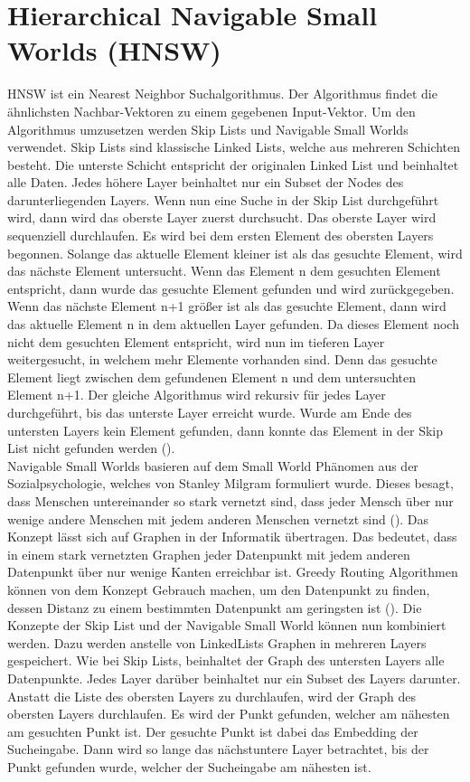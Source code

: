 \section{Hierarchical Navigable Small Worlds (HNSW)}
HNSW ist ein Nearest Neighbor Suchalgorithmus.
Der Algorithmus findet die ähnlichsten Nachbar-Vektoren zu einem gegebenen Input-Vektor.
Um den Algorithmus umzusetzen werden Skip Lists und Navigable Small Worlds verwendet.
Skip Lists sind klassische Linked Lists, welche aus mehreren Schichten besteht.
Die unterste Schicht entspricht der originalen Linked List und beinhaltet alle Daten.
Jedes höhere Layer beinhaltet nur ein Subset der Nodes des darunterliegenden Layers.
Wenn nun eine Suche in der Skip List durchgeführt wird, dann wird das oberste Layer zuerst durchsucht.
Das oberste Layer wird sequenziell durchlaufen.
Es wird bei dem ersten Element des obersten Layers begonnen.
Solange das aktuelle Element kleiner ist als das gesuchte Element, wird das nächste Element untersucht.
Wenn das Element n dem gesuchten Element entspricht, dann wurde das gesuchte Element gefunden und wird zurückgegeben.
Wenn das nächste Element n+1 größer ist als das gesuchte Element, dann wird das aktuelle Element n in dem aktuellen Layer gefunden.
Da dieses Element noch nicht dem gesuchten Element entspricht, wird nun im tieferen Layer weitergesucht, in welchem mehr Elemente vorhanden sind.
Denn das gesuchte Element liegt zwischen dem gefundenen Element n und dem untersuchten Element n+1.
Der gleiche Algorithmus wird rekursiv für jedes Layer durchgeführt, bis das unterste Layer erreicht wurde.
Wurde am Ende des untersten Layers kein Element gefunden, dann konnte das Element in der Skip List nicht gefunden werden (\cite{10.5555/93711}).\\

Navigable Small Worlds basieren auf dem Small World Phänomen aus der Sozialpsychologie, welches von Stanley Milgram formuliert wurde.
Dieses besagt, dass Menschen untereinander so stark vernetzt sind, dass jeder Mensch über nur wenige andere Menschen mit jedem anderen Menschen vernetzt sind (\cite{Milgram_1967}).
Das Konzept lässt sich auf Graphen in der Informatik übertragen.
Das bedeutet, dass in einem stark vernetzten Graphen jeder Datenpunkt mit jedem anderen Datenpunkt über nur wenige Kanten erreichbar ist.
Greedy Routing Algorithmen können von dem Konzept Gebrauch machen, um den Datenpunkt zu finden, dessen Distanz zu einem bestimmten Datenpunkt am geringsten ist (\cite{Malkov_Yashunin_2020}).
Die Konzepte der Skip List und der Navigable Small World können nun kombiniert werden.
Dazu werden anstelle von LinkedLists Graphen in mehreren Layers gespeichert.
Wie bei Skip Lists, beinhaltet der Graph des untersten Layers alle Datenpunkte.
Jedes Layer darüber beinhaltet nur ein Subset des Layers darunter.
Anstatt die Liste des obersten Layers zu durchlaufen, wird der Graph des obersten Layers durchlaufen.
Es wird der Punkt gefunden, welcher am nähesten am gesuchten Punkt ist.
Der gesuchte Punkt ist dabei das Embedding der Sucheingabe.
Dann wird so lange das nächstuntere Layer betrachtet, bis der Punkt gefunden wurde, welcher der Sucheingabe am nähesten ist.\\

